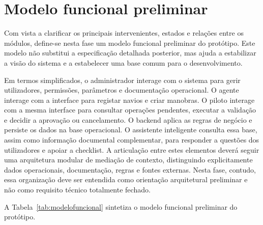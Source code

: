 \documentclass[a4paper,12pt]{report}
\begin{document}
\section{Modelo funcional preliminar}

Com vista a clarificar os principais intervenientes, estados e relações entre os módulos, define-se nesta fase um modelo funcional preliminar do protótipo. Este modelo não substitui a especificação detalhada posterior, mas ajuda a estabilizar a visão do sistema e a estabelecer uma base comum para o desenvolvimento.

Em termos simplificados, o administrador interage com o sistema para gerir utilizadores, permissões, parâmetros e documentação operacional. O agente interage com a interface para registar navios e criar manobras. O piloto interage com a mesma interface para consultar operações pendentes, executar a validação e decidir a aprovação ou cancelamento. O backend aplica as regras de negócio e persiste os dados na base operacional. O assistente inteligente consulta essa base, assim como informação documental complementar, para responder a questões dos utilizadores e apoiar a checklist. A articulação entre estes elementos deverá seguir uma arquitetura modular de mediação de contexto, distinguindo explicitamente dados operacionais, documentação, regras e fontes externas. Nesta fase, contudo, essa organização deve ser entendida como orientação arquitetural preliminar e não como requisito técnico totalmente fechado.

A Tabela~\ref{tab:modelofuncional} sintetiza o modelo funcional preliminar do protótipo.
\end{document}
